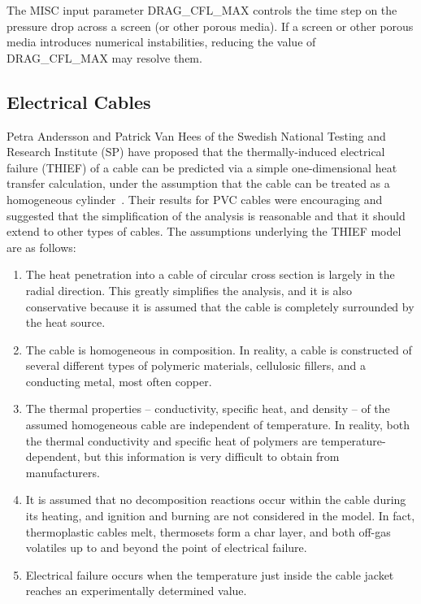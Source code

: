 \documentclass[11pt]{book}
\begin{document}
The {\ct MISC} input parameter {\ct DRAG\_CFL\_MAX} controls the time step on the pressure drop across a screen (or other porous media). If a screen or other porous media introduces numerical instabilities, reducing the value of {\ct DRAG\_CFL\_MAX} may resolve them.

\subsection{Electrical Cables}
\label{info:THIEF}

Petra Andersson and Patrick Van Hees of the Swedish National Testing and Research Institute (SP) have proposed that the thermally-induced electrical failure (THIEF) of a cable can be predicted via a simple one-dimensional heat transfer calculation, under the assumption that the cable can be treated as a homogeneous cylinder~\cite{Andersson:2005}. Their results for PVC cables were encouraging and suggested that the simplification of the analysis is reasonable and that it should extend to other types of cables. The assumptions underlying the THIEF model are as follows:
\begin{enumerate}
\item The heat penetration into a cable of circular cross section is largely in the radial direction. This greatly simplifies the analysis, and it is also conservative because it is assumed that the cable is completely surrounded by the heat source.
\item The cable is homogeneous in composition. In reality, a cable is constructed of several different types of polymeric materials, cellulosic fillers, and a conducting metal, most often copper.
\item The thermal properties -- conductivity, specific heat, and density -- of the assumed homogeneous cable are independent of temperature. In reality, both the thermal conductivity and specific heat of polymers are temperature-dependent, but this information is very difficult to obtain from manufacturers.
\item It is assumed that no decomposition reactions occur within the cable during its heating, and ignition and burning are not considered in the model. In fact, thermoplastic cables melt, thermosets form a char layer, and both off-gas volatiles up to and beyond the point of electrical failure.
\item Electrical failure occurs when the temperature just inside the cable jacket reaches an experimentally determined value.
\end{enumerate}
\end{document}
